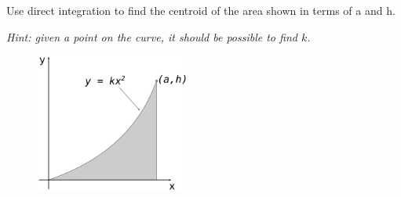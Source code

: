 
\noindent Use direct integration to find the centroid of the area shown in terms of a and h.  

\noindent\textit{Hint: given a point on the curve, it should be possible to find $k$.}


\begin{figure}[ht!]
  \centering
  \includegraphics[height=1.8in]{fig-qz.png}
\end{figure}

